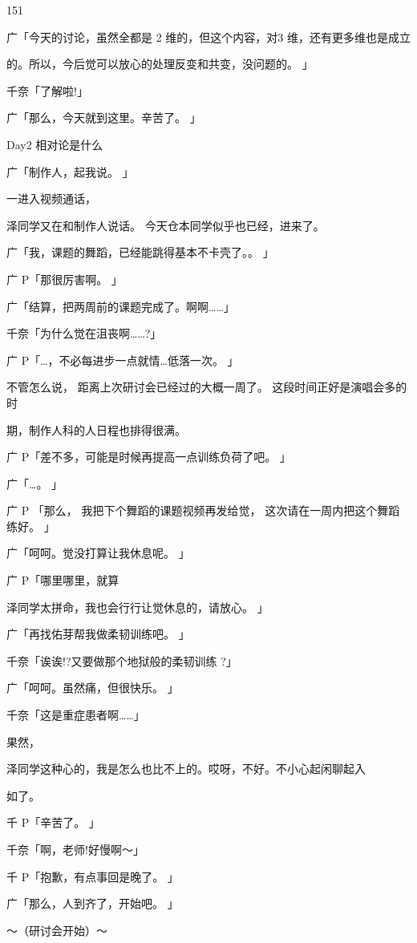151\par
广「今天的讨论，虽然全都是 2 维的，但这个内容，对3 维，还有更多维也是成立\par
的。所以，今后觉可以放心的处理反变和共变，没问题的。 」\par
千奈「了解啦!」\par
广「那么，今天就到这里。辛苦了。 」\par
Day2 相对论是什么\par
广「制作人，起我说。 」\par
一进入视频通话，\par
泽同学又在和制作人说话。 今天仓本同学似乎也已经，进来了。\par
广「我，课题的舞蹈，已经能跳得基本不卡壳了。。 」\par
广 P「那很厉害啊。 」\par
广「结算，把两周前的课题完成了。啊啊……」\par
千奈「为什么觉在沮丧啊……?」\par
广 P「…，不必每进步一点就情…低落一次。 」\par
不管怎么说， 距离上次研讨会已经过的大概一周了。 这段时间正好是演唱会多的时\par
期，制作人科的人日程也排得很满。\par
广 P「差不多，可能是时候再提高一点训练负荷了吧。 」\par
广「…。 」\par
广 P 「那么， 我把下个舞蹈的课题视频再发给觉， 这次请在一周内把这个舞蹈练好。 」\par
广「呵呵。觉没打算让我休息呢。 」\par
广 P「哪里哪里，就算\par
泽同学太拼命，我也会行行让觉休息的，请放心。 」\par
广「再找佑芽帮我做柔韧训练吧。 」\par
千奈「诶诶!?又要做那个地狱般的柔韧训练 ?」\par
广「呵呵。虽然痛，但很快乐。 」\par
千奈「这是重症患者啊……」\par
果然，\par
泽同学这种心的，我是怎么也比不上的。哎呀，不好。不小心起闲聊起入\par
如了。\par
千 P「辛苦了。 」\par
千奈「啊，老师!好慢啊～」\par
千 P「抱歉，有点事回是晚了。 」\par
广「那么，人到齐了，开始吧。 」\par
～（研讨会开始）～\par

